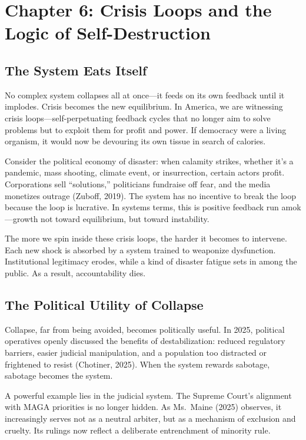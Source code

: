 \section{Chapter 6: Crisis Loops and the Logic of
Self-Destruction}\label{chapter-6-crisis-loops-and-the-logic-of-self-destruction}

\subsection{The System Eats Itself}\label{the-system-eats-itself}

No complex system collapses all at once---it feeds on its own feedback
until it implodes. Crisis becomes the new equilibrium. In America, we
are witnessing crisis loops---self-perpetuating feedback cycles that no
longer aim to solve problems but to exploit them for profit and power.
If democracy were a living organism, it would now be devouring its own
tissue in search of calories.

Consider the political economy of disaster: when calamity strikes,
whether it's a pandemic, mass shooting, climate event, or insurrection,
certain actors profit. Corporations sell ``solutions,'' politicians
fundraise off fear, and the media monetizes outrage (Zuboff, 2019). The
system has no incentive to break the loop because the loop is lucrative.
In systems terms, this is positive feedback run amok---growth not toward
equilibrium, but toward instability.

The more we spin inside these crisis loops, the harder it becomes to
intervene. Each new shock is absorbed by a system trained to weaponize
dysfunction. Institutional legitimacy erodes, while a kind of disaster
fatigue sets in among the public. As a result, accountability dies.

\subsection{The Political Utility of
Collapse}\label{the-political-utility-of-collapse}

Collapse, far from being avoided, becomes politically useful. In 2025,
political operatives openly discussed the benefits of destabilization:
reduced regulatory barriers, easier judicial manipulation, and a
population too distracted or frightened to resist (Chotiner, 2025). When
the system rewards sabotage, sabotage becomes the system.

A powerful example lies in the judicial system. The Supreme Court's
alignment with MAGA priorities is no longer hidden. As Ms.~Maine (2025)
observes, it increasingly serves not as a neutral arbiter, but as a
mechanism of exclusion and cruelty. Its rulings now reflect a deliberate
entrenchment of minority rule.

